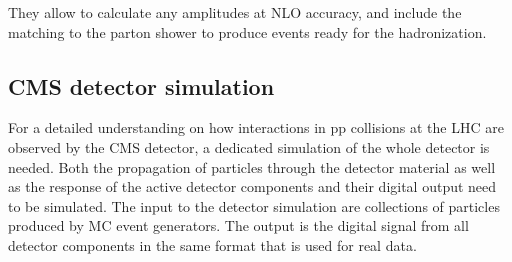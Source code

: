 They allow to calculate any amplitudes at NLO accuracy, and include the matching to the parton shower to produce events ready for the hadronization.

\subsection{CMS detector simulation}\label{subsec:fullSim}

For a detailed understanding on how interactions in pp collisions at the LHC are observed by the CMS detector, a dedicated simulation of the whole detector is needed.
Both the propagation of particles through the detector material as well as the response of the active detector components and their digital output need to be simulated.
The input to the detector simulation are collections of particles produced by MC event generators. The output is the digital signal from all detector components in the same format that is used for real data.

